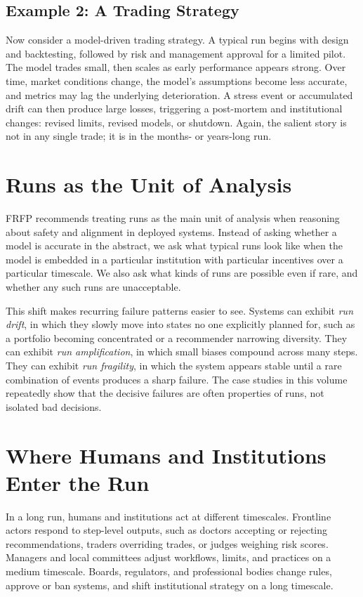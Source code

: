 \subsection*{Example 2: A Trading Strategy}

Now consider a model-driven trading strategy. A typical run begins with design and backtesting, followed by risk and management approval for a limited pilot. The model trades small, then scales as early performance appears strong. Over time, market conditions change, the model’s assumptions become less accurate, and metrics may lag the underlying deterioration. A stress event or accumulated drift can then produce large losses, triggering a post-mortem and institutional changes: revised limits, revised models, or shutdown. Again, the salient story is not in any single trade; it is in the months- or years-long run.

\section{Runs as the Unit of Analysis}

FRFP recommends treating runs as the main unit of analysis when reasoning about safety and alignment in deployed systems. Instead of asking whether a model is accurate in the abstract, we ask what typical runs look like when the model is embedded in a particular institution with particular incentives over a particular timescale. We also ask what kinds of runs are possible even if rare, and whether any such runs are unacceptable.

This shift makes recurring failure patterns easier to see. Systems can exhibit \emph{run drift}, in which they slowly move into states no one explicitly planned for, such as a portfolio becoming concentrated or a recommender narrowing diversity. They can exhibit \emph{run amplification}, in which small biases compound across many steps. They can exhibit \emph{run fragility}, in which the system appears stable until a rare combination of events produces a sharp failure. The case studies in this volume repeatedly show that the decisive failures are often properties of runs, not isolated bad decisions.

\section{Where Humans and Institutions Enter the Run}

In a long run, humans and institutions act at different timescales. Frontline actors respond to step-level outputs, such as doctors accepting or rejecting recommendations, traders overriding trades, or judges weighing risk scores. Managers and local committees adjust workflows, limits, and practices on a medium timescale. Boards, regulators, and professional bodies change rules, approve or ban systems, and shift institutional strategy on a long timescale.

